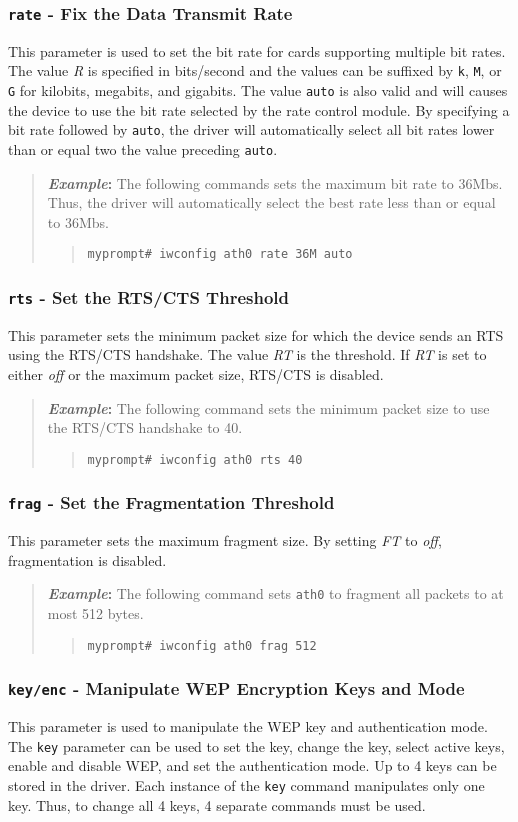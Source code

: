 \documentclass[10pt,fullpage]{article}
\newcommand{\mytt}[1]{{\texttt{#1}}}
\newcommand{\bv}{\begin{verse}}
\newcommand{\ev}{\end{verse}}
\newcommand{\cmd}[1]{{\texttt{myprompt\# #1}}}
\newcommand{\clival}[1]{{\emph{#1}}}
\newenvironment{example}{\begin{quote}\textbf{\textit{Example}:}}{\end{quote}}
\begin{document}
\subsubsection{\mytt{rate} - Fix the Data Transmit Rate}
This parameter is used to set the bit rate for cards supporting
multiple bit rates.  The value \clival{R} is specified in bits/second
and the values can be suffixed by \mytt{k}, \mytt{M}, or \mytt{G} for
kilobits, megabits, and gigabits.  The value \mytt{auto} is also valid
and will causes the device to use the bit rate selected by the rate
control module.  By specifying a bit rate followed by \mytt{auto}, the driver
will automatically select all bit rates lower than or equal two the
value preceding \mytt{auto}.
\begin{example}
  The following commands sets the maximum bit rate to 36Mbs.  Thus,
  the driver will automatically select the best rate less than or
  equal to 36Mbs.
  \bv
  \cmd{iwconfig ath0 rate 36M auto}
  \ev
\end{example}

\subsubsection{\mytt{rts} - Set the RTS/CTS Threshold}
This parameter sets the minimum packet size for which the device sends
an RTS using the RTS/CTS handshake.  The value \clival{RT} is the
threshold.  If \clival{RT} is set to either \clival{off} or the
maximum packet size, RTS/CTS is disabled.
\begin{example}
  The following command sets the minimum packet size to use the
  RTS/CTS handshake to 40.
  \bv
  \cmd{iwconfig ath0 rts 40}
  \ev
\end{example}

\subsubsection{\mytt{frag} - Set the Fragmentation Threshold}
This parameter sets the maximum fragment size.  By setting
\clival{FT} to \clival{off}, fragmentation is disabled.
\begin{example}
  The following command sets \mytt{ath0} to fragment all packets to at
  most 512 bytes.
  \bv 
  \cmd{iwconfig ath0 frag 512}
  \ev
\end{example}

\subsubsection{\mytt{key/enc} - Manipulate WEP Encryption Keys and
  Mode}
This parameter is used to manipulate the WEP key and authentication
mode.  The \mytt{key} parameter can be used to set the key, change the
key, select active keys, enable and disable WEP, and set the
authentication mode.  Up to 4 keys can be stored in the driver.  Each
instance of the \mytt{key} command manipulates only one key.  Thus, to
change all 4 keys, 4 separate commands must be used.
\end{document}
